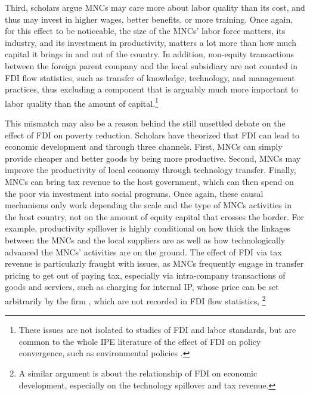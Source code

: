 Third, scholars argue MNCs may care more about labor quality than its cost, and
thus may invest in higher wages, better benefits, or more training. Once again,
for this effect to be noticeable, the size of the MNCs' labor force matters, its
industry, and its investment in productivity, matters a lot more than how much
capital it brings in and out of the country. In addition, non-equity
transactions between the foreign parent company and the local subsidiary are not
counted in FDI flow statistics, such as transfer of knowledge, technology, and
management practices, thus excluding a component that is arguably much more
important to labor quality than the amount of capital.\footnote{These issues are
not isolated to studies of FDI and labor standards, but are common to the whole
IPE literature of the effect of FDI on policy convergence, such as environmental
policies \citep{Prakash2007}.}

This mismatch may also be a reason behind the still unsettled debate on the
effect of FDI on poverty reduction. Scholars have theorized that FDI can lead to
economic development and through three channels. First, MNCs can simply provide
cheaper and better goods by being more productive. Second, MNCs may improve the
productivity of local economy through technology transfer. Finally, MNCs can
bring tax revenue to the host government, which can then spend on the poor via
investment into social programs. Once again, these causal mechanisms only work
depending the scale and the type of MNCs activities in the host country, not on
the amount of equity capital that crosses the border. For example, productivity
spillover is highly conditional on how thick the linkages between the MNCs and
the local suppliers are as well as how technologically advanced the MNCs'
activities are on the ground. The effect of FDI via tax revenue is particularly
fraught with issues, as MNCs frequently engage in transfer pricing to get out of
paying tax, especially via intra-company transactions of goods and services,
such as charging for internal IP, whose price can be set arbitrarily by the firm
\citep{Malesky2015c}, which are not recorded in FDI flow statistics, \footnote{A
similar argument is about the relationship of FDI on economic development,
especially on the technology spillover and tax revenue.}

